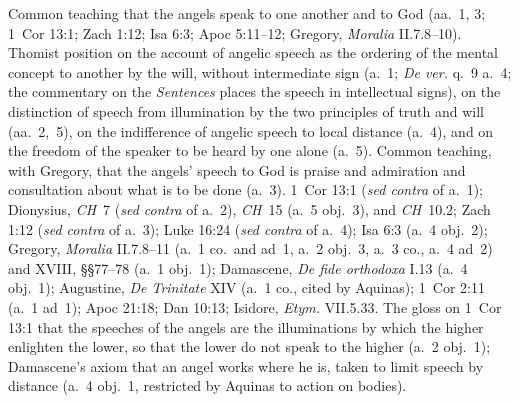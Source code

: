  {Common teaching that the angels speak to one another and to God (aa.~1,
 3; 1~Cor 13:1; Zach 1:12; Isa 6:3; Apoc 5:11--12; Gregory, \emph{Moralia}
 II.7.8--10). Thomist position on the account of angelic speech as the
 ordering of the mental concept to another by the will, without
 intermediate sign (a.~1; \emph{De ver.} q.~9 a.~4; the commentary on the
 \emph{Sentences} places the speech in intellectual signs), on the
 distinction of speech from illumination by the two principles of truth and
 will (aa.~2,~5), on the indifference of angelic speech to local distance
 (a.~4), and on the freedom of the speaker to be heard by one alone (a.~5).
 Common teaching, with Gregory, that the angels' speech to God is praise
 and admiration and consultation about what is to be done (a.~3).}
 {1~Cor 13:1 (\emph{sed contra} of a.~1); Dionysius, \emph{CH}~7 (\emph{sed
 contra} of a.~2), \emph{CH}~15 (a.~5 obj.~3), and \emph{CH}~10.2; Zach 1:12 (\emph{sed contra} of a.~3); Luke 16:24
 (\emph{sed contra} of a.~4); Isa 6:3 (a.~4 obj.~2); Gregory,
 \emph{Moralia} II.7.8--11 (a.~1 co.\ and ad~1, a.~2 obj.~3, a.~3 co., a.~4
 ad~2) and XVIII, \S\S77--78 (a.~1 obj.~1); Damascene, \emph{De fide
 orthodoxa} I.13 (a.~4 obj.~1); Augustine, \emph{De Trinitate} XIV (a.~1 co.,
 cited by Aquinas); 1~Cor 2:11 (a.~1 ad~1); Apoc 21:18; Dan 10:13; Isidore,
 \emph{Etym.} VII.5.33.}
 {The gloss on 1~Cor 13:1 that the speeches of the angels are the
 illuminations by which the higher enlighten the lower, so that the lower
 do not speak to the higher (a.~2 obj.~1); Damascene's axiom that an angel
 works where he is, taken to limit speech by distance (a.~4 obj.~1,
 restricted by Aquinas to action on bodies).}
